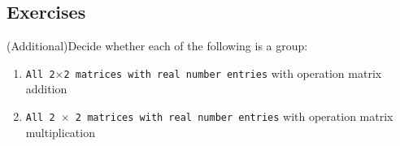 
\renewcommand{\theenumi}{\alph{enumi}}
\renewcommand{\labelenumi}{(\theenumi)}
\subsection{Exercises}

\begin{exercise}
    {(Additional)}Decide whether each of the following is a group:
    \begin{enumerate}
        \item \texttt{All 2\(\times\)2 matrices with real number entries} with operation matrix addition
        \item \texttt{All 2 \(\times\) 2 matrices with real number entries} with operation matrix multiplication
    \end{enumerate}

\end{exercise}

